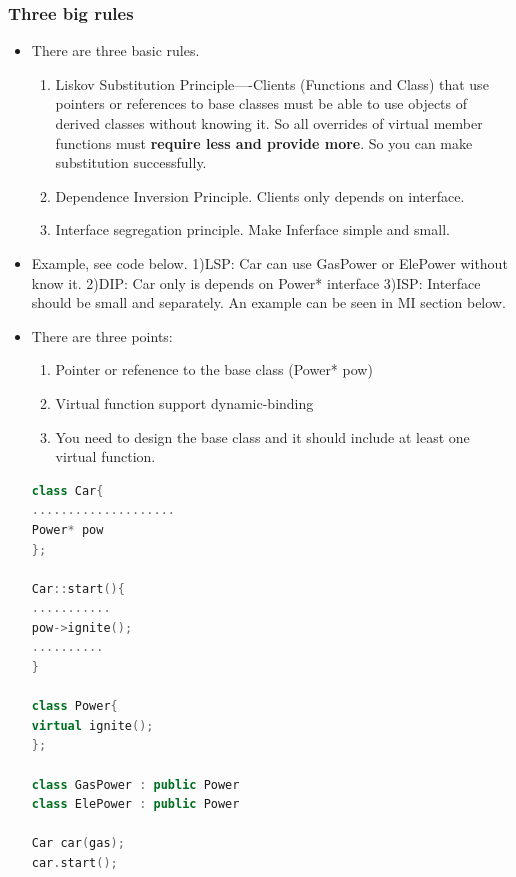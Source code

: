 \documentclass[a4paper,11pt,twoside]{book}
\begin{document}
\subsubsection{Three big rules}
\begin{itemize}
	\item There are three basic rules.
\begin{enumerate}
	\item Liskov Substitution Principle----Clients (Functions and Class) that use pointers or references to base classes must be able to use objects of derived classes without knowing it.  So all overrides of virtual member functions must \textbf{require less and provide more}. So you can make substitution successfully.
	
	\item Dependence Inversion Principle. Clients only depends on interface.
	
	\item Interface segregation principle. Make Inferface simple and small.
\end{enumerate}

\item Example, see code below.  1)LSP: Car can use  GasPower or ElePower without know it. 2)DIP: Car only is depends on Power* interface 3)ISP: Interface should be small and separately. An example can be seen in MI section below.

\item There are three points:
\begin{enumerate}
	\item Pointer or refenence to the base class (Power* pow)
	\item Virtual function support dynamic-binding
	\item You need to design the base class and it should include at least one virtual function.
\end{enumerate}

\begin{lstlisting}[frame=single, language=c++]
class Car{
....................
Power* pow
};

Car::start(){
...........
pow->ignite();
..........
}

class Power{
virtual ignite();
};

class GasPower : public Power
class ElePower : public Power

Car car(gas);
car.start();
\end{lstlisting}

\end{itemize}
\end{document}
